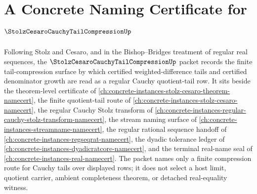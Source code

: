 \chapter{A Concrete Naming Certificate for $\StolzCesaroCauchyTailCompressionUp$}
\label{ch:concrete-instances-stolz-cesaro-cauchy-tail-compression-namecert}

Following Stolz and Cesaro, and in the Bishop--Bridges treatment of regular real sequences, the $\StolzCesaroCauchyTailCompressionUp$ packet records the finite tail-compression surface by which certified weighted-difference tails and certified denominator growth are read as a regular Cauchy quotient-tail row. It sits beside the theorem-level certificate of \autoref{ch:concrete-instances-stolz-cesaro-theorem-namecert}, the finite quotient-tail route of \autoref{ch:concrete-instances-stolz-cesaro-namecert}, the regular Cauchy Stolz transform of \autoref{ch:concrete-instances-regular-cauchy-stolz-transform-namecert}, the stream naming surface of \autoref{ch:concrete-instances-streamname-namecert}, the regular rational sequence handoff of \autoref{ch:concrete-instances-regseqrat-namecert}, the dyadic tolerance ledger of \autoref{ch:concrete-instances-dyadicratcore-namecert}, and the terminal real-name seal of \autoref{ch:concrete-instances-real-namecert}. The packet names only a finite compression route for Cauchy tails over displayed rows; it does not select a host limit, quotient carrier, ambient completeness theorem, or detached real-equality witness.

